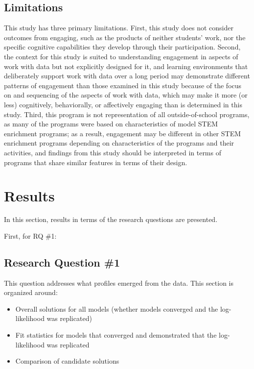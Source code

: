 \documentclass[]{book}
\providecommand{\tightlist}{%
  \setlength{\itemsep}{0pt}\setlength{\parskip}{0pt}}
\theoremstyle{definition}
\theoremstyle{definition}
\theoremstyle{definition}
\theoremstyle{remark}
\begin{document}
\section{Limitations}\label{limitations}

This study has three primary limitations. First, this study does not
consider outcomes from engaging, such as the products of neither
students' work, nor the specific cognitive capabilities they develop
through their participation. Second, the context for this study is
suited to understanding engagement in aspects of work with data but not
explicitly designed for it, and learning environments that deliberately
support work with data over a long period may demonstrate different
patterns of engagement than those examined in this study because of the
focus on and sequencing of the aspects of work with data, which may make
it more (or less) cognitively, behaviorally, or affectively engaging
than is determined in this study. Third, this program is not
representation of all outside-of-school programs, as many of the
programs were based on characteristics of model STEM enrichment
programs; as a result, engagement may be different in other STEM
enrichment programs depending on characteristics of the programs and
their activities, and findings from this study should be interpreted in
terms of programs that share similar features in terms of their design.

\chapter{Results}\label{results}

In this section, results in terms of the research questions are
presented.

First, for RQ \#1:

\section{Research Question \#1}\label{research-question-1}

This question addresses what profiles emerged from the data. This
section is organized around:

\begin{itemize}
\tightlist
\item
  Overall solutions for all models (whether models converged and the
  log-likelihood was replicated)
\item
  Fit statistics for models that converged and demonstrated that the
  log-likelihood was replicated
\item
  Comparison of candidate solutions
\end{itemize}
\end{document}
